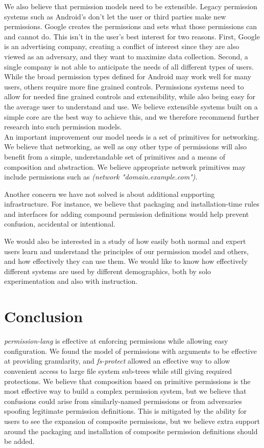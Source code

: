 We also believe that permission models need to be extensible.
Legacy permission systems such as Android's don't let the user or third parties make new permissions. 
Google creates the permissions and sets what those permissions can and cannot do. 
This isn't in the user's best interest for two reasons. 
First, Google is an advertising company, creating a conflict of interest since they are also viewed as an adversary, and they want to maximize data collection.  
Second, a single company is not able to anticipate the needs of all different types of users.  While the broad permission types defined for Android may work well for many users, others require more fine grained controls.
Permissions systems need to allow for needed fine grained controls and extensibility, while also being easy for the average user to understand and use.
We believe extensible systems built on a simple core are the best way to achieve this, and we therefore recommend further research into such permission models.
\\
\indent
An important improvement our model needs is a set of primitives for networking.  We believe that networking, as well as ony other type of permissions will also benefit from a simple, understandable set of primitives and a means of composition and abstraction.  We believe appropriate network primitives may include permissions such as \textit{(network "domain.example.com")}.

Another concern we have not solved is about additional supporting infrastructure.  For instance, we believe that packaging and installation-time rules and interfaces for adding compound permission definitions would help prevent confusion, accidental or intentional.

We would also be interested in a study of how easily both normal and expert users learn and understand the principles of our permission model and others, and how effectively they can use them.  
We would like to know how effectively different systems are used by different demographics, both by solo experimentation and also with instruction.



\section{Conclusion}\label{section:conclusion}
\textit{permission-lang} is effective at enforcing permissions while allowing easy configuration.  We found the model of permissions with arguments to be effective at providing granularity, and \textit{fs-protect} allowed an effective way to allow convenient access to large file system sub-trees while still giving required protections.
We believe that composition based on primitive permissions is the most effective way to build a complex permission system, but we believe that confusions could arise from similarly-named permissions or from adversaries spoofing legitimate permission definitions.  This is mitigated by the ability for users to see the expansion of composite permissions, but we believe extra support around the packaging and installation of composite permission definitions should be added.

